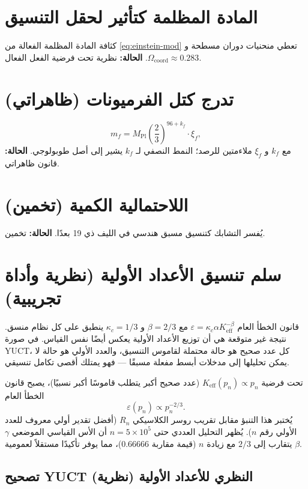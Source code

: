 \documentclass[11pt,a4paper]{article}
\newcommand{\coord}{\mathrm{coord}}
\begin{document}
	\section{المادة المظلمة كتأثير لحقل التنسيق}
	\label{sec:DM}
	كثافة المادة المظلمة الفعالة من \eqref{eq:einstein-mod} تعطي منحنيات دوران مسطحة و \(\Omega_{\coord} \approx 0.283\). \textbf{الحالة:} نظرية تحت فرضية الفعل الفعال.
	
	\section{تدرج كتل الفرميونات (ظاهراتي)}
	\label{sec:masses}
	\[
	m_f = M_{\mathrm{Pl}} \left(\frac{2}{3}\right)^{96 + k_f} \cdot \xi_f,
	\]
	مع \(k_f\) و \(\xi_f\) ملاءمتين للرصد؛ النمط النصفي لـ \(k_f\) يشير إلى أصل طوبولوجي. \textbf{الحالة:} قانون ظاهراتي.
	
	\section{اللاحتمالية الكمية (تخمين)}
	\label{sec:nonlocality}
	يُفسر التشابك كتنسيق مسبق هندسي في الليف ذي 19 بعدًا. \textbf{الحالة:} تخمين.
	
	\section{سلم تنسيق الأعداد الأولية (نظرية وأداة تجريبية)}
	\label{sec:primes}
	
	قانون الخطأ العام \(\varepsilon = \kappa_c\alpha K_{\mathrm{eff}}^{-\beta}\) مع \(\beta=2/3\) و \(\kappa_c=1/3\) ينطبق على كل نظام منسق. نتيجة غير متوقعة هي أن توزيع الأعداد الأولية يعكس أيضًا نفس القياس. في صورة YUCT، كل عدد صحيح هو حالة محتملة لقاموس التنسيق، والعدد الأولي هو حالة لا يمكن تحليلها إلى مدخلات أبسط مفعلة مسبقًا — فهو يمتلك أقصى تكامل تنسيقي.
	
	تحت فرضية \(K_{\mathrm{eff}}(p_n) \propto p_n\) (عدد صحيح أكبر يتطلب قاموسًا أكبر نسبيًا)، يصبح قانون الخطأ العام
	\[
	\varepsilon(p_n) \propto p_n^{-2/3}.
	\]
	يُختبر هذا التنبؤ مقابل تقريب روسر الكلاسيكي \(R_n\) (أفضل تقدير أولي معروف للعدد الأولي رقم \(n\)). يُظهر التحليل العددي حتى \(n = 5\times10^5\) أن الأس القياسي الموضعي \(\gamma\) يتقارب إلى \(2/3\) مع زيادة \(n\) (قيمة مقاربة \(0.66666\))، مما يوفر تأكيدًا مستقلاً لعمومية \(\beta\).
	
	\subsection{تصحيح YUCT النظري للأعداد الأولية (نظرية)}
	
\end{document}
